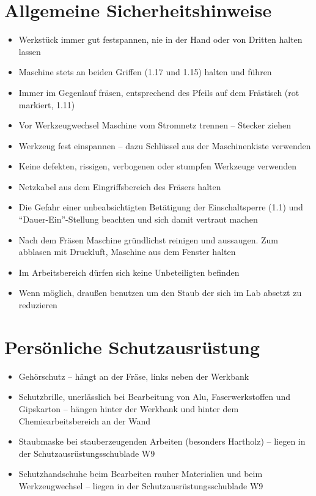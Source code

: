 \documentclass{\basedir/fablab-document}
\begin{document}
\section[Allgemeine Sicherheitshinweise]{Allgemeine Sicherheitshinweise}
\begin{itemize}
\item Werkstück immer gut festspannen, nie in der Hand oder von Dritten halten lassen
\item Maschine stets an beiden Griffen (1.17 und 1.15) halten und führen
\item Immer im Gegenlauf fräsen, entsprechend des Pfeils auf dem Frästisch (rot markiert, 1.11)
\item Vor Werkzeugwechsel Maschine vom Stromnetz trennen -- Stecker ziehen
\item Werkzeug fest einspannen -- dazu Schlüssel aus der Maschinenkiste verwenden
\item Keine defekten, rissigen, verbogenen oder stumpfen Werkzeuge verwenden
\item Netzkabel aus dem Eingriffsbereich des Fräsers halten
\item Die Gefahr einer unbeabsichtigten Betätigung der Einschaltsperre (1.1) und ``Dauer-Ein''-Stellung beachten und sich damit vertraut machen
\item Nach dem Fräsen Maschine gründlichst reinigen und aussaugen. Zum abblasen mit Druckluft, Maschine aus dem Fenster halten
\item Im Arbeitsbereich dürfen sich keine Unbeteiligten befinden
\item Wenn möglich, draußen benutzen um den Staub der sich im Lab absetzt zu reduzieren
\end{itemize}


\section{Persönliche Schutzausrüstung}
\begin{itemize}
\item Gehörschutz -- hängt an der Fräse, links neben der Werkbank
\item Schutzbrille, unerlässlich bei Bearbeitung von Alu, Faserwerkstoffen und Gipskarton -- hängen hinter der Werkbank und hinter dem Chemiearbeitsbereich an der Wand
\item Staubmaske bei stauberzeugenden Arbeiten (besonders Hartholz) -- liegen in der Schutzausrüstungsschublade W9
\item Schutzhandschuhe beim Bearbeiten rauher Materialien und beim Werkzeugwechsel -- liegen in der Schutzausrüstungsschublade W9
\end{itemize}
\end{document}
